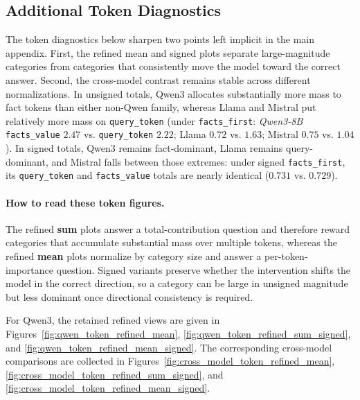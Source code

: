 \subsection{Additional Token Diagnostics}
\label{sec:appendix_extra_token_gallery}

The token diagnostics below sharpen two points left implicit in the main appendix. First, the refined mean and signed plots separate large-magnitude categories from categories that consistently move the model toward the correct answer. Second, the cross-model contrast remains stable across different normalizations. In unsigned totals, Qwen3 allocates substantially more mass to fact tokens than either non-Qwen family, whereas Llama and Mistral put relatively more mass on \texttt{query\_token} (under \texttt{facts\_first}: \textit{Qwen3-8B} \texttt{facts\_value} $2.47$ vs. \texttt{query\_token} $2.22$; Llama $0.72$ vs. $1.63$; Mistral $0.75$ vs. $1.04$). In signed totals, Qwen3 remains fact-dominant, Llama remains query-dominant, and Mistral falls between those extremes: under signed \texttt{facts\_first}, its \texttt{query\_token} and \texttt{facts\_value} totals are nearly identical ($0.731$ vs. $0.729$).

\paragraph{How to read these token figures.}
The refined \textbf{sum} plots answer a total-contribution question and therefore reward categories that accumulate substantial mass over multiple tokens, whereas the refined \textbf{mean} plots normalize by category size and answer a per-token-importance question. Signed variants preserve whether the intervention shifts the model in the correct direction, so a category can be large in unsigned magnitude but less dominant once directional consistency is required.

For Qwen3, the retained refined views are given in Figures~\ref{fig:qwen_token_refined_mean}, \ref{fig:qwen_token_refined_sum_signed}, and \ref{fig:qwen_token_refined_mean_signed}. The corresponding cross-model comparisons are collected in Figures~\ref{fig:cross_model_token_refined_mean}, \ref{fig:cross_model_token_refined_sum_signed}, and \ref{fig:cross_model_token_refined_mean_signed}.

